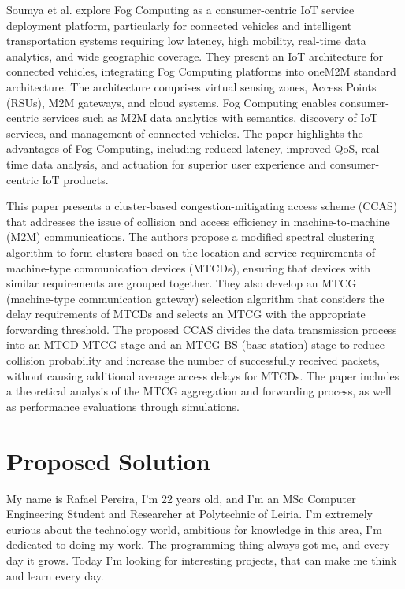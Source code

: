 \documentclass[a4paper,fleqn]{cas-dc}
\begin{document}
Soumya et al. \cite{Datta2015} explore Fog Computing as a consumer-centric IoT service deployment platform, particularly for connected vehicles and intelligent transportation systems requiring low latency, high mobility, real-time data analytics, and wide geographic coverage. They present an IoT architecture for connected vehicles, integrating Fog Computing platforms into oneM2M standard architecture. The architecture comprises virtual sensing zones, Access Points (RSUs), M2M gateways, and cloud systems. Fog Computing enables consumer-centric services such as M2M data analytics with semantics, discovery of IoT services, and management of connected vehicles. The paper highlights the advantages of Fog Computing, including reduced latency, improved QoS, real-time data analysis, and actuation for superior user experience and consumer-centric IoT products.

This paper \cite{Liang2018} presents a cluster-based congestion-mitigating access scheme (CCAS) that addresses the issue of collision and access efficiency in machine-to-machine (M2M) communications. The authors propose a modified spectral clustering algorithm to form clusters based on the location and service requirements of machine-type communication devices (MTCDs), ensuring that devices with similar requirements are grouped together. They also develop an MTCG (machine-type communication gateway) selection algorithm that considers the delay requirements of MTCDs and selects an MTCG with the appropriate forwarding threshold. The proposed CCAS divides the data transmission process into an MTCD-MTCG stage and an MTCG-BS (base station) stage to reduce collision probability and increase the number of successfully received packets, without causing additional average access delays for MTCDs. The paper includes a theoretical analysis of the MTCG aggregation and forwarding process, as well as performance evaluations through simulations.


\section{Proposed Solution}



\printcredits

%
%




My name is Rafael Pereira, I'm 22 years old, and I'm an MSc Computer Engineering Student and Researcher at Polytechnic of Leiria. I'm extremely curious about the technology world, ambitious for knowledge in this area, I'm dedicated to doing my work. The programming thing always got me, and every day it grows. Today I'm looking for interesting projects, that can make me think and learn every day.
\endbio
\end{document}
